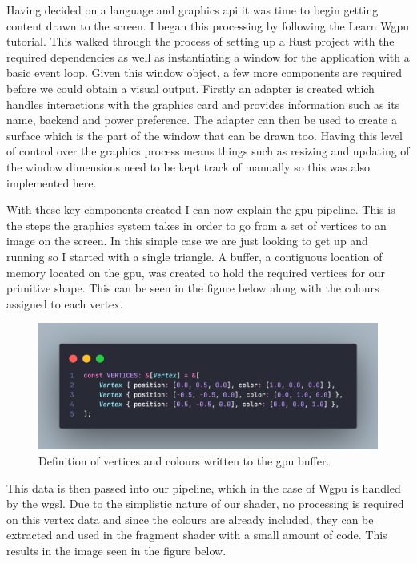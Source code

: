 \documentclass[titlepage]{article}
\begin{document}
Having decided on a language and graphics \acrshort{api} it was time to begin getting content drawn to the screen. I began this processing by following the Learn Wgpu \cite{wgpu:tutorial} tutorial. This walked through the process of setting up a Rust project with the required dependencies as well as instantiating a window for the application with a basic event loop. Given this window object, a few more components are required before we could obtain a visual output. Firstly an adapter is created which handles interactions with the graphics card and provides information such as its name, backend and power preference. The adapter can then be used to create a surface which is the part of the window that can be drawn too. Having this level of control over the graphics process means things such as resizing and updating of the window dimensions need to be kept track of manually so this was also implemented here.

With these key components created I can now explain the \acrshort{gpu} pipeline. This is the steps the graphics system takes in order to go from a set of vertices to an image on the screen. In this simple case we are just looking to get up and running so I started with a single triangle. A buffer, a contiguous location of memory located on the \acrshort{gpu}, was created to hold the required vertices for our primitive shape. This can be seen in the figure below along with the colours assigned to each vertex.

\begin{figure}[htp]
    \centering
    \includegraphics[width=0.75 \textwidth]{triangle_vertices.png}
    \caption{Definition of vertices and colours written to the \acrshort{gpu} buffer.}
\end{figure}
\FloatBarrier

This data is then passed into our pipeline, which in the case of Wgpu is handled by the \acrfull{wgsl}. Due to the simplistic nature of our shader, no processing is required on this vertex data and since the colours are already included, they can be extracted and used in the fragment shader with a small amount of code. This results in the image seen in the figure below.
\end{document}
